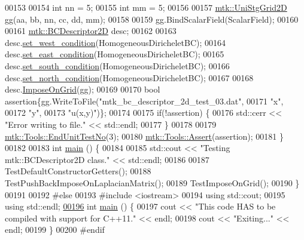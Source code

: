 \begin{DoxyCode}
00153 
00154   \textcolor{keywordtype}{int} nn = 5;
00155   \textcolor{keywordtype}{int} mm = 5;
00156 
00157   \hyperlink{classmtk_1_1UniStgGrid2D}{mtk::UniStgGrid2D} gg(aa, bb, nn, cc, dd, mm);
00158 
00159   gg.BindScalarField(ScalarField);
00160 
00161   \hyperlink{classmtk_1_1BCDescriptor2D}{mtk::BCDescriptor2D} desc;
00162 
00163   desc.\hyperlink{classmtk_1_1BCDescriptor2D_a006050efe15b1be75b36a74a23051392}{set\_west\_condition}(HomogeneousDiricheletBC);
00164   desc.\hyperlink{classmtk_1_1BCDescriptor2D_a4ba8690e845f59a1507b056f3fc8061e}{set\_east\_condition}(HomogeneousDiricheletBC);
00165   desc.\hyperlink{classmtk_1_1BCDescriptor2D_a408f159cc44d7ee610191efb8ed48b2a}{set\_south\_condition}(HomogeneousDiricheletBC);
00166   desc.\hyperlink{classmtk_1_1BCDescriptor2D_a690f6881a88b202c074d9f90f2a7ddb0}{set\_north\_condition}(HomogeneousDiricheletBC);
00167 
00168   desc.\hyperlink{classmtk_1_1BCDescriptor2D_a5f0ff1fda1b5266dcd77ba2301c8ba2c}{ImposeOnGrid}(gg);
00169 
00170   \textcolor{keywordtype}{bool} assertion\{gg.WriteToFile(\textcolor{stringliteral}{"mtk\_bc\_descriptor\_2d\_test\_03.dat"},
00171                                 \textcolor{stringliteral}{"x"},
00172                                 \textcolor{stringliteral}{"y"},
00173                                 \textcolor{stringliteral}{"u(x,y)"})\};
00174 
00175   \textcolor{keywordflow}{if}(!assertion) \{
00176     std::cerr << \textcolor{stringliteral}{"Error writing to file."} << std::endl;
00177   \}
00178 
00179   \hyperlink{classmtk_1_1Tools_aba67d9dc35c9c1c49430fcc9ea035e03}{mtk::Tools::EndUnitTestNo}(3);
00180   \hyperlink{classmtk_1_1Tools_ac6804df469c94ab6a796fb64f1e44a89}{mtk::Tools::Assert}(assertion);
00181 \}
00182 
00183 \textcolor{keywordtype}{int} \hyperlink{mtk__bc__descriptor__2d__test_8cc_ae66f6b31b5ad750f1fe042a706a4e3d4}{main} () \{
00184 
00185   std::cout << \textcolor{stringliteral}{"Testing mtk::BCDescriptor2D class."} << std::endl;
00186 
00187   TestDefaultConstructorGetters();
00188   TestPushBackImposeOnLaplacianMatrix();
00189   TestImposeOnGrid();
00190 \}
00191 
00192 \textcolor{preprocessor}{#else}
00193 \textcolor{preprocessor}{#include <iostream>}
00194 \textcolor{keyword}{using} std::cout;
00195 \textcolor{keyword}{using} std::endl;
\hypertarget{mtk__bc__descriptor__2d__test_8cc_source_l00196}{}\hyperlink{mtk__bc__descriptor__2d__test_8cc_ae66f6b31b5ad750f1fe042a706a4e3d4}{00196} \textcolor{keywordtype}{int} \hyperlink{mtk__bc__descriptor__2d__test_8cc_ae66f6b31b5ad750f1fe042a706a4e3d4}{main} () \{
00197   cout << \textcolor{stringliteral}{"This code HAS to be compiled with support for C++11."} << endl;
00198   cout << \textcolor{stringliteral}{"Exiting..."} << endl;
00199 \}
00200 \textcolor{preprocessor}{#endif}
\end{DoxyCode}
